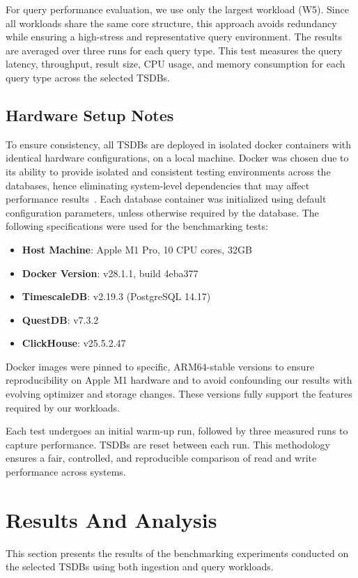 \documentclass[conference]{IEEEtran}
\begin{document}
For query performance evaluation, we use only the largest workload (W5). Since all workloads share the same core structure, this approach avoids redundancy while ensuring a high-stress and representative query environment. The results are averaged over three runs for each query type. This test measures the query latency, throughput, result size, CPU usage, and memory consumption for each query type across the selected TSDBs.

\subsection{Hardware Setup Notes}
To ensure consistency, all TSDBs are deployed in isolated docker containers with identical hardware configurations, on a local machine. Docker was chosen due to its ability to provide isolated and consistent testing environments across the databases, hence eliminating system-level dependencies that may affect performance results~\cite{16_felter2015docker}. 
Each database container was initialized using default configuration parameters, unless otherwise required by the database. The following specifications were used for the benchmarking tests:
\begin{itemize}
  \item \textbf{Host Machine}: Apple M1 Pro, 10 CPU cores, 32GB
  \item \textbf{Docker Version}: v28.1.1, build 4eba377
  \item \textbf{TimescaleDB}: v2.19.3 (PostgreSQL 14.17)
  \item \textbf{QuestDB}: v7.3.2
  \item \textbf{ClickHouse}: v25.5.2.47
\end{itemize}

Docker images were pinned to specific, ARM64-stable versions to ensure reproducibility on Apple M1 hardware and to avoid confounding our results with evolving optimizer and storage changes. These versions fully support the features required by our workloads.

Each test undergoes an initial warm-up run, followed by three measured runs to capture performance. TSDBs are reset between each run. This methodology ensures a fair, controlled, and reproducible comparison of read and write performance across systems.

\section{Results And Analysis}\label{sec:results}
This section presents the results of the benchmarking experiments conducted on the selected TSDBs using both ingestion and query workloads.
\end{document}
